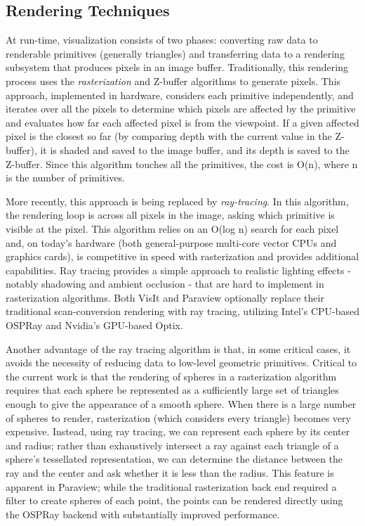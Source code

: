\documentclass[journal]{IEEEtran}
\begin{document}
\subsection{Rendering Techniques}
At run-time, visualization consists of two phases: converting raw data to renderable primitives (generally triangles) and transferring data to a rendering subsystem that produces pixels in an image buffer.  Traditionally, this rendering process uses the \textit{rasterization} and Z-buffer algorithms to generate pixels. This approach, implemented in hardware, considers each primitive independently, and iterates over all the pixels to determine which pixels are affected by the primitive and evaluates how far each affected pixel is from the viewpoint. If a given affected pixel is the closest so far (by comparing depth with the current value in the Z-buffer), it is shaded and saved to the image buffer, and its depth is saved to the Z-buffer.  Since this algorithm touches all the primitives, the cost is O(n), where n is the number of primitives.

More recently, this approach is being replaced by \textit{ray-tracing}.  In this algorithm, the rendering loop is across all pixels in the image, asking which primitive is visible at the pixel.  This algorithm relies on an O(log n) search for each pixel and, on today's hardware (both general-purpose multi-core vector CPUs and graphics cards), is competitive in speed with rasterization and provides additional capabilities.  Ray tracing provides a simple approach to realistic lighting effects - notably shadowing and ambient occlusion - that are hard to implement in rasterization algorithms.  Both VisIt and Paraview optionally replace their traditional scan-conversion rendering with ray tracing, utilizing Intel's CPU-based OSPRay and Nvidia's GPU-based Optix.  

Another advantage of the ray tracing algorithm is that, in some critical cases, it avoids the necessity of reducing data to low-level geometric primitives.  Critical to the current work is that the rendering of spheres in a rasterization algorithm requires that each sphere be represented as a sufficiently large set of triangles enough to give the appearance of a smooth sphere.   When there is a large number of spheres to render, rasterization (which considers every triangle) becomes very expensive.  Instead, using ray tracing, we can represent each sphere by its center and radius; rather than exhaustively intersect a ray against each triangle of a sphere's tessellated representation, we can determine the distance between the ray and the center and ask whether it is less than the radius.  This feature is apparent in Paraview; while the traditional rasterization back end required a filter to create spheres of each point, the points can be rendered directly using the OSPRay backend with substantially improved performance.
\end{document}
